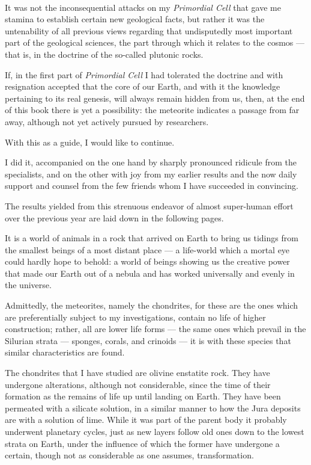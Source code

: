 \documentclass[a4paper, 12pt, oneside]{article}
\begin{document}
\paragraph*{}
It was not the inconsequential attacks on my \emph{Primordial Cell} that gave me stamina to establish certain new geological facts, but rather it was the untenability of all previous views regarding that undisputedly most important part of the geological sciences, the part through which it relates to the cosmos --- that is, in the doctrine of the so-called plutonic rocks.

If, in the first part of \emph{Primordial Cell} I had tolerated the doctrine and with resignation accepted that the core of our Earth, and with it the knowledge pertaining to its real genesis, will always remain hidden from us, then, at the end of this book there is yet a possibility: the meteorite indicates a passage from far away, although not yet actively pursued by researchers.

With this as a guide, I would like to continue.

I did it, accompanied on the one hand by sharply pronounced ridicule from the specialists, and on the other with joy from my earlier results and the now daily support and counsel from the few friends whom I have succeeded in convincing.

The results yielded from this strenuous endeavor of almost super-human effort over the previous year are laid down in the following pages.

It is a world of animals in a rock that arrived on Earth to bring us tidings from the smallest beings of a most distant place --- a life-world which a mortal eye could hardly hope to behold: a world of beings showing us the creative power that made our Earth out of a nebula and has worked universally and evenly in the universe.

Admittedly, the meteorites, namely the chondrites, for these are the ones which are preferentially subject to my investigations, contain no life of higher construction; rather, all are lower life forms --- the same ones which prevail in the Silurian strata --- sponges, corals, and crinoids --- it is with these species that similar characteristics are found.

The chondrites that I have studied are olivine enstatite rock. They have undergone alterations, although not considerable, since the time of their formation as the remains of life up until landing on Earth. They have been permeated with a silicate solution, in a similar manner to how the Jura deposits are with a solution of lime. While it was part of the parent body it probably underwent planetary cycles, just as new layers follow old ones down to the lowest strata on Earth, under the influence of which the former have undergone a certain, though not as considerable as one assumes, transformation.
\end{document}
